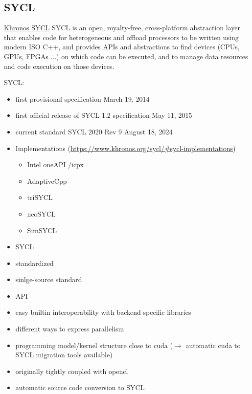 \subsection{SYCL}
\label{sec:frameworks:sycl}

\begin{quotebox}{\href{https://www.khronos.org/sycl/}{Khronos SYCL}}
    SYCL is an open, royalty-free, cross-platform abstraction layer that enables code for heterogeneous and offload processors to be written using modern ISO C++, and provides APIs and abstractions to find devices (CPUs, GPUs, FPGAs ...) on which code can be executed, and to manage data resources and code execution on those devices.
\end{quotebox}

SYCL:
\begin{itemize}
    \item first provisional specification March 19, 2014~\cite{khronos_sycl_working_group_khronos_2014}
    \item first official release of SYCL 1.2 specification May 11, 2015~\cite{khronos_sycl_working_group_khronos_2015}
    \item current standard SYCL 2020 Rev 9 August 18, 2024~\cite{khronos_sycl_working_group_sycl_2024}
    \item Implementations (\url{https://www.khronos.org/sycl/#sycl-implementations})
    \begin{itemize}
        \item Intel oneAPI \dpcpp/icpx
        \item AdaptiveCpp
        \item triSYCL
        \item neoSYCL
        \item SimSYCL
    \end{itemize}
\end{itemize}

\begin{itemize}
    \item SYCL
    \item standardized
    \item sinlge-source standard \cpp
    \item \cpp API
    \item easy builtin interoperability with backend specific libraries
    \item different ways to express parallelism
    \item programming model/kernel structure close to \gls{cuda} ($\rightarrow$ automatic \gls{cuda} to SYCL migration tools available)
    \item originally tightly coupled with \gls{opencl}
    \item automatic source code conversion to SYCL~\cite{huang_syclomatic_2023, noauthor_oneapi-srcsyclomatic_2025} 
\end{itemize}

